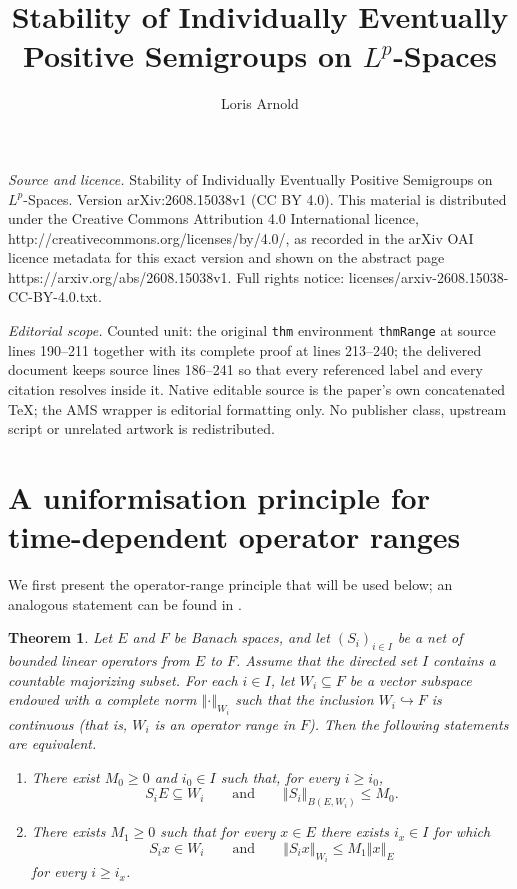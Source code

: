 \documentclass[10pt,a4paper]{amsart}
\newtheorem{thm}{Theorem}[section]
\newcommand{\norm}[1]{\left\Vert #1\right\Vert}
\begin{document}
\title[Stability of Individually Eventually Positive Semigroups on ]{Stability of Individually Eventually Positive Semigroups on $L^p$-Spaces}
\author{Loris Arnold}
\date{}
\maketitle
\noindent\emph{Source and licence.} Stability of Individually Eventually Positive Semigroups on $L^p$-Spaces. Version arXiv:2608.15038v1 (CC BY 4.0). This material is distributed under the Creative Commons Attribution 4.0 International licence, http://creativecommons.org/licenses/by/4.0/, as recorded in the arXiv OAI licence metadata for this exact version and shown on the abstract page https://arxiv.org/abs/2608.15038v1. Full rights notice: licenses/arxiv-2608.15038-CC-BY-4.0.txt.\par\smallskip
\noindent\textit{Editorial scope.} Counted unit: the original \texttt{thm} environment \texttt{thmRange} at source lines 190--211 together with its complete proof at lines 213--240; the delivered document keeps source lines 186--241 so that every referenced label and every citation resolves inside it. Native editable source is the paper's own concatenated TeX; the AMS wrapper is editorial formatting only. No publisher class, upstream script or unrelated artwork is redistributed.
	\section{A uniformisation principle for time-dependent operator ranges}
	
	We first present the operator-range principle that will be used below; an analogous statement can be found in \cite[Theorem 2.6]{AroraGlueck2024}.
	

	\begin{thm}
		\label{thmRange}
		Let $E$ and $F$ be Banach spaces, and let $(S_i)_{i\in I}$ be a net of bounded linear operators from $E$ to $F$. Assume that the directed set $I$ contains a countable majorizing subset. For each $i\in I$, let $W_i\subseteq F$ be a vector subspace endowed with a complete norm $\norm{\cdot}_{W_i}$ such that the inclusion $W_i\hookrightarrow F$ is continuous (that is, $W_i$ is an operator range in $F$). Then the following statements are equivalent.
		\begin{enumerate}[label=\upshape(\alph*)]
			\item\label{itUnif}
			There exist $M_0\ge 0$ and $i_0\in I$ such that, for every $i\ge i_0$,
			\[
			S_i E \subseteq W_i
			\qquad\text{and}\qquad
			\norm{S_i}_{B(E, W_i)} \le M_0.
			\]
			
			\item\label{itIndiv}
			There exists $M_1\ge 0$ such that for every $x\in E$ there exists $i_x\in I$ for which
			\[
			S_i x \in W_i
			\qquad\text{and}\qquad
			\norm{S_i x}_{W_i} \le M_1\norm{x}_E
			\]
			for every $i\ge i_x$.
		\end{enumerate}
	\end{thm}
\end{document}
